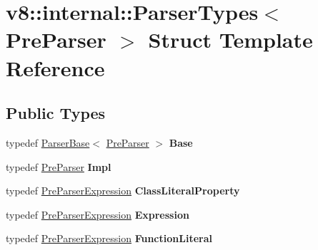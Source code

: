 \hypertarget{structv8_1_1internal_1_1ParserTypes_3_01PreParser_01_4}{}\section{v8\+:\+:internal\+:\+:Parser\+Types$<$ Pre\+Parser $>$ Struct Template Reference}
\label{structv8_1_1internal_1_1ParserTypes_3_01PreParser_01_4}
\subsection*{Public Types}
\begin{DoxyCompactItemize}
\item 
\mbox{\label{structv8_1_1internal_1_1ParserTypes_3_01PreParser_01_4_a16f7d6f4116f37b2419b757158abc0c6}} 
typedef \mbox{\hyperlink{classv8_1_1internal_1_1ParserBase}{Parser\+Base}}$<$ \mbox{\hyperlink{classv8_1_1internal_1_1PreParser}{Pre\+Parser}} $>$ {\bfseries Base}
\item 
\mbox{\label{structv8_1_1internal_1_1ParserTypes_3_01PreParser_01_4_ac55cd86fe437267c302fc8d1721c14fd}} 
typedef \mbox{\hyperlink{classv8_1_1internal_1_1PreParser}{Pre\+Parser}} {\bfseries Impl}
\item 
\mbox{\label{structv8_1_1internal_1_1ParserTypes_3_01PreParser_01_4_a0c518b8cbf80b5021202acf80203b9c0}} 
typedef \mbox{\hyperlink{classv8_1_1internal_1_1PreParserExpression}{Pre\+Parser\+Expression}} {\bfseries Class\+Literal\+Property}
\item 
\mbox{\label{structv8_1_1internal_1_1ParserTypes_3_01PreParser_01_4_ad4d5e638f3eb21f30fcea6ea26a9a75a}} 
typedef \mbox{\hyperlink{classv8_1_1internal_1_1PreParserExpression}{Pre\+Parser\+Expression}} {\bfseries Expression}
\item 
\mbox{\label{structv8_1_1internal_1_1ParserTypes_3_01PreParser_01_4_a538f7e1e98967351c33d083d85d0804e}} 
typedef \mbox{\hyperlink{classv8_1_1internal_1_1PreParserExpression}{Pre\+Parser\+Expression}} {\bfseries Function\+Literal}

\end{DoxyCompactItemize}
